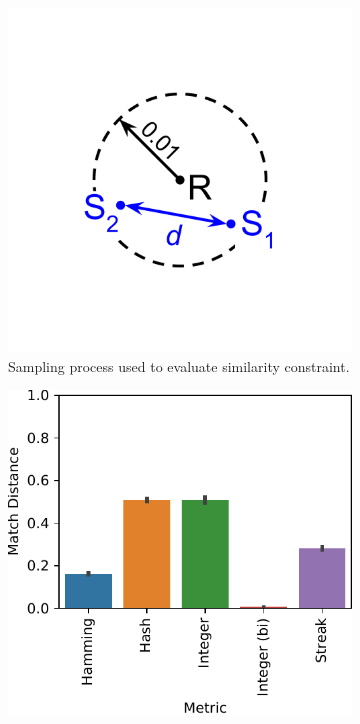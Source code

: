 \begin{figure}
\begin{center}

\begin{minipage}{\linewidth}
\begin{subfigure}[b]{\linewidth}
\begin{minipage}{0.5\textwidth}
\begin{center}
\includegraphics[width=0.5\linewidth,trim=5cm 5cm 5cm 5cm, clip]{img/dimensionality-statistic}
\end{center}
\end{minipage}%
\begin{minipage}{0.5\textwidth}
\caption{
Sampling process used to evaluate similarity constraint.
}
\label{fig:dimensionality_measure}
\end{minipage}
\end{subfigure}
\end{minipage}
\begin{subfigure}[b]{\linewidth}
\begin{minipage}{0.6\linewidth}
\includegraphics[width=\linewidth]{img/sphere/bitweight=0dot5+seed=1+title=dimensionality_barplot+_data_hathash_hash=c0f6c5cf854ff253+_script_fullcat_hash=03ce1e318a24a109+ext=}

\end{minipage}
\end{subfigure}
\end{center}
\end{figure}
